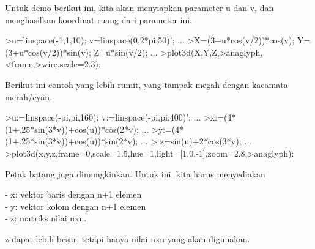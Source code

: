 \documentclass[12pt,arial,letterpaper]{book}
\begin{document}
\begin{eulernootebook}
\begin{eulercomment}
\begin{eulercomment}
\begin{eulernootebook}
\begin{eulercomment}
\begin{eulercomment}
\begin{eulercomment}
\begin{eulercomment}
\begin{eulercomment}
\begin{eulercomment}
\begin{eulercomment}
\begin{eulernotebook}
\begin{eulercomment}
Untuk demo berikut ini, kita akan menyiapkan parameter u dan v, dan
menghasilkan koordinat ruang dari parameter ini.
\end{eulercomment}
\begin{eulerprompt}
>u=linspace(-1,1,10); v=linspace(0,2*pi,50)'; ...
>X=(3+u*cos(v/2))*cos(v); Y=(3+u*cos(v/2))*sin(v); Z=u*sin(v/2); ...
>plot3d(X,Y,Z,>anaglyph,<frame,>wire,scale=2.3):
\end{eulerprompt}
\begin{eulercomment}
Berikut ini contoh yang lebih rumit, yang tampak megah dengan kacamata
merah/cyan.
\end{eulercomment}
\begin{eulerprompt}
>u:=linspace(-pi,pi,160); v:=linspace(-pi,pi,400)';  ...
>x:=(4*(1+.25*sin(3*v))+cos(u))*cos(2*v); ...
>y:=(4*(1+.25*sin(3*v))+cos(u))*sin(2*v); ...
> z=sin(u)+2*cos(3*v); ...
>plot3d(x,y,z,frame=0,scale=1.5,hue=1,light=[1,0,-1],zoom=2.8,>anaglyph):
\end{eulerprompt}
\begin{eulercomment}
Petak batang juga dimungkinkan. Untuk ini, kita harus menyediakan

-   x: vektor baris dengan n+1 elemen\\
-   y: vektor kolom dengan n+1 elemen\\
-   z: matriks nilai nxn.

z dapat lebih besar, tetapi hanya nilai nxn yang akan digunakan.


\end{eulercomment}
\end{eulernotebook}
\end{eulercomment}
\end{eulercomment}
\end{eulercomment}
\end{eulercomment}
\end{eulercomment}
\end{eulercomment}
\end{eulercomment}
\end{eulernootebook}
\end{eulercomment}
\end{eulercomment}
\end{eulernootebook}
\end{document}

